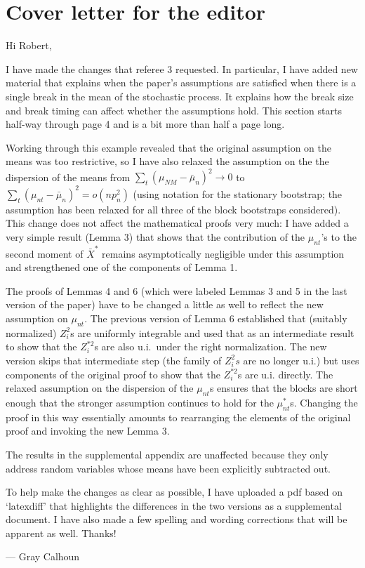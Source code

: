 \documentclass[12pt]{article}
\begin{document}
\section*{\hfill Cover letter for the editor\hfill}

Hi Robert,

I have made the changes that referee 3 requested. In particular, I
have added new material that explains when the paper's assumptions are
satisfied when there is a single break in the mean of the stochastic
process. It explains how the break size and break timing can affect
whether the assumptions hold. This section starts half-way through
page 4 and is a bit more than half a page long.

Working through this example revealed that the original assumption
on the means was too restrictive, so I have also relaxed the
assumption on the the dispersion of the means from
$\sum_t (\mu_{NM} - \bar \mu_n)^2 \to 0$ to
$\sum_t (\mu_{nt} - \bar \mu_n)^2 = o(n p_n^2)$ (using notation for
the stationary bootstrap; the assumption has been relaxed for all
three of the block bootstraps considered).  This change does not
affect the mathematical proofs very much: I have added a very simple
result (Lemma 3) that shows that the contribution of the $\mu_{nt}$'s to the
second moment of $\bar X^*$ remains asymptotically negligible under
this assumption and strengthened one of the components of Lemma 1.

The proofs of Lemmas 4 and 6 (which were labeled Lemmas 3 and 5 in the
last version of the paper) have to be changed a little as well to
reflect the new assumption on $\mu_{nt}$. The previous version of
Lemma 6 established that (suitably normalized) $Z_i^2$s are uniformly
integrable and used that as an intermediate result to show that the
$Z_i^{*2}$s are also u.i.\ under the right normalization. The new
version skips that intermediate step (the family of $Z_i^2s$ are no
longer u.i.) but uses components of the original proof to show that
the $Z_i^{*2}$s are u.i. directly. The relaxed assumption on the
dispersion of the $\mu_{nt}$s ensures that the blocks are short
enough that the stronger assumption continues to hold for the
$\mu_{nt}^*$s.
Changing the proof in this way essentially amounts to rearranging the
elements of the original proof and invoking the new Lemma 3.

The results in the supplemental appendix are unaffected because they
only address random variables whose means have been explicitly
subtracted out.

To help make the changes as clear as possible, I have uploaded a
pdf based on `latexdiff' that highlights the differences in the
two versions as a supplemental document. I have also made a few
spelling and wording corrections that will be apparent as well.
Thanks!

\strut

\noindent --- Gray Calhoun
\end{document}
